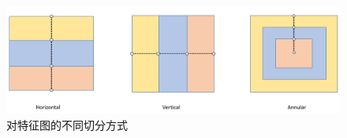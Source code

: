 \begin{figure}[h]
  \centering
  \includegraphics[width=1.0\linewidth]{Img/annular.pdf}
  \caption{对特征图的不同切分方式}
  \label{fig:annular}
\end{figure}
